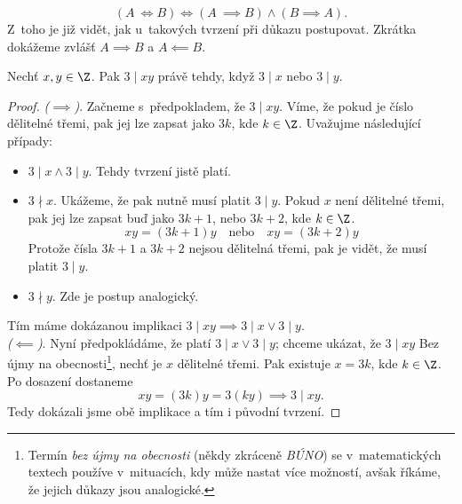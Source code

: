 \begin{equation*}
    (A~\iff B) \iff (A~\implies B) \land (B \implies A).
\end{equation*}
Z~toho je již vidět, jak u~takových tvrzení při důkazu postupovat. Zkrátka dokážeme zvlášť $A \implies B$ a $A \impliedby B$.
\begin{proposition}
    Nechť $x,y\in\Z$. Pak $3 \mid xy$ právě tehdy, když $3 \mid x$ nebo $3 \mid y$.
\end{proposition}
\begin{proof}
    \textit{($\implies$)}. Začneme s~předpokladem, že $3 \mid xy$. Víme, že pokud je číslo dělitelné třemi, pak jej lze zapsat jako $3k$, kde $k\in\Z$. Uvažujme následující případy:
    \begin{itemize}
        \item $3 \mid x \land 3 \mid y$. Tehdy tvrzení jistě platí.
        \item $3 \nmid x$. Ukážeme, že pak nutně musí platit $3 \mid y$. Pokud $x$ není dělitelné třemi, pak jej lze zapsat buď jako $3k+1$, nebo $3k+2$, kde $k\in\Z$. 
        \begin{equation*}
            xy=(3k+1)y\quad\text{nebo}\quad xy=(3k+2)y
        \end{equation*}
        Protože čísla $3k+1$ a $3k+2$ nejsou dělitelná třemi, pak je vidět, že musí platit $3 \mid y$.
        \item $3 \nmid y$. Zde je postup analogický. 
    \end{itemize}
    Tím máme dokázanou implikaci $3 \mid xy \implies 3 \mid x \lor 3 \mid y$.\\
    \textit{($\impliedby$)}. Nyní předpokládáme, že platí $3 \mid x \lor 3 \mid y$; chceme ukázat, že $3 \mid xy$ Bez újmy na obecnosti\footnote{Termín \emph{bez újmy na obecnosti} (někdy zkráceně \emph{BÚNO}) se v~matematických textech používe v~mituacích, kdy může nastat více možností, avšak říkáme, že jejich důkazy jsou analogické.}, nechť je $x$ dělitelné třemi. Pak existuje $x=3k$, kde $k\in\Z$. Po dosazení dostaneme
    \begin{equation*}
        xy=(3k)y=3(ky) \implies 3 \mid xy.
    \end{equation*}
    Tedy dokázali jsme obě implikace a tím i původní tvrzení.
\end{proof}

